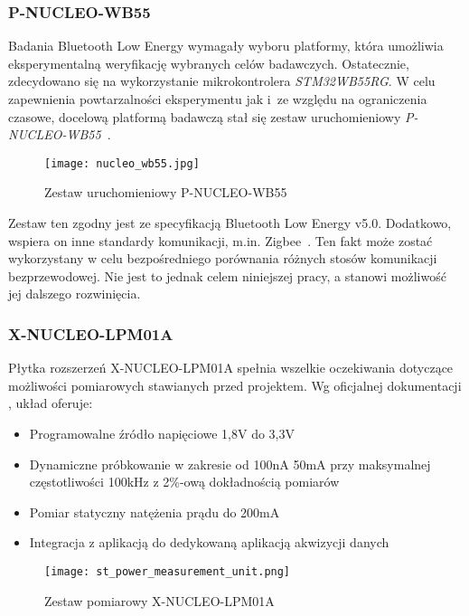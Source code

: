 \subsubsection{P-NUCLEO-WB55}

Badania Bluetooth Low Energy wymagały wyboru platformy, która umożliwia eksperymentalną 
weryfikację wybranych celów badawczych. Ostatecznie, zdecydowano się na wykorzystanie 
mikrokontrolera \textit{STM32WB55RG}. W celu zapewnienia powtarzalności eksperymentu jak 
i~ze względu na ograniczenia czasowe, docelową platformą badawczą stał się zestaw 
uruchomieniowy \textit{P-NUCLEO-WB55}~\cite{noauthor_p-nucleo-wb55_nodate}.

\begin{figure}[!htb]
	\centering \texttt{[image: nucleo\_wb55.jpg]}
	\caption{Zestaw uruchomieniowy P-NUCLEO-WB55}
	\label{rys:nucleo_wb55}
\end{figure}

Zestaw ten zgodny jest ze specyfikacją Bluetooth Low Energy v5.0. Dodatkowo, wspiera
on inne standardy komunikacji, m.in. Zigbee~\cite{noauthor_stm32wb_2022}.
Ten fakt może zostać wykorzystany w celu bezpośredniego porównania różnych stosów komunikacji bezprzewodowej.
Nie jest to jednak celem niniejszej pracy, a stanowi możliwość jej dalszego 
rozwinięcia.


\subsubsection{X-NUCLEO-LPM01A} \label{device:plytka_pomiarowa}

Płytka rozszerzeń X-NUCLEO-LPM01A spełnia wszelkie oczekiwania dotyczące możliwości pomiarowych
stawianych przed projektem. Wg oficjalnej dokumentacji \cite{noauthor_um2243_2018}, układ oferuje:

\begin{itemize}
\item Programowalne źródło napięciowe 1,8V do 3,3V
\item Dynamiczne próbkowanie w zakresie od 100nA 50mA przy maksymalnej częstotliwości 100kHz z 2\%-ową dokładnością pomiarów
\item Pomiar statyczny natężenia prądu do 200mA
\item Integracja z aplikacją do dedykowaną aplikacją akwizycji danych \cite{noauthor_stm32cubemonpwr_2022}
\end{itemize}

\begin{figure}[!ht]
	\centering \texttt{[image: st\_power\_measurement\_unit.png]}
	\caption{Zestaw pomiarowy X-NUCLEO-LPM01A}
	\label{rys:nucleo_lpm01a}
\end{figure}

